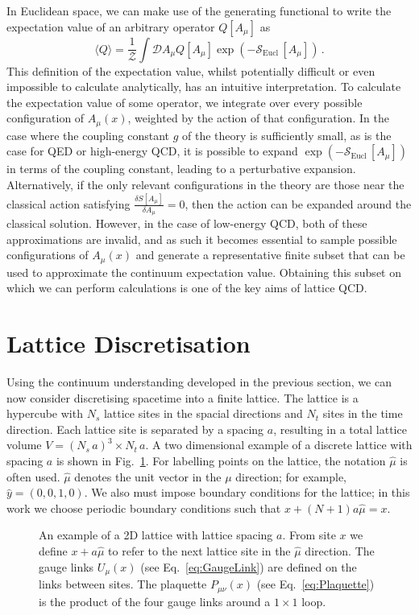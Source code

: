 In Euclidean space, we can make use of the generating functional to write the expectation value of an arbitrary operator $Q[A_\mu]$ as~\cite{Luscher:1984xn}
%
\begin{equation}
\langle Q \rangle = \frac{1}{\mathcal{Z}}\int \mathcal{D} A_\mu Q[A_\mu] \exp\left(-\mathcal{S}_{\text{Eucl}}\,[A_\mu]\right)\, .
\end{equation}
%
This definition of the expectation value, whilst potentially difficult or even impossible to calculate analytically, has an intuitive interpretation. To calculate the expectation value of some operator, we integrate over every possible configuration of $A_\mu(x)$, weighted by the action of that configuration. In the case where the coupling constant $g$ of the theory is sufficiently small, as is the case for QED or high-energy QCD, it is possible to expand $\exp\left(-\mathcal{S}_{\text{Eucl}}\,[A_\mu]\right)$ in terms of the coupling constant, leading to a perturbative expansion. Alternatively, if the only relevant configurations in the theory are those near the classical action satisfying $\frac{\delta S[A_\mu]}{\delta A_\mu}=0$, then the action can be expanded around the classical solution. However, in the case of low-energy QCD, both of these approximations are invalid, and as such it becomes essential to sample possible configurations of $A_\mu(x)$ and generate a representative finite subset that can be used to approximate the continuum expectation value. Obtaining this subset on which we can perform calculations is one of the key aims of lattice QCD.

\section{Lattice Discretisation}\label{sec:LatticeDiscretisation}
Using the continuum understanding developed in the previous section, we can now consider discretising spacetime into a finite lattice. The lattice is a hypercube with $N_s$ lattice sites in the spacial directions and $N_t$ sites in the time direction. Each lattice site is separated by a spacing $a$, resulting in a total lattice volume $V=(N_s\,a)^3\times N_t\,a$. A two dimensional example of a discrete lattice with spacing $a$ is shown in Fig.~\ref{fig:LatticeExample}. For labelling points on the lattice, the notation $\hat{\mu}$ is often used. $\hat{\mu}$ denotes the unit vector in the $\mu$ direction; for example, $\hat{y} = (0,0,1,0)$. We also must impose boundary conditions for the lattice; in this work we choose periodic boundary conditions such that $x+(N+1)a\hat{\mu}=x$.\\
%
\begin{figure}[ht]
\centering

\caption[An example of a 2D lattice with lattice spacing $a$.]{\label{fig:LatticeExample} An example of a 2D lattice with lattice spacing $a$. From site $x$ we define $x+a\hat{\mu}$ to refer to the next lattice site in the $\hat{\mu}$ direction. The gauge links $U_\mu(x)$ (see Eq.~\ref{eq:GaugeLink}) are defined on the links between sites. The plaquette $P_{\mu\nu}(x)$ (see Eq.~\ref{eq:Plaquette}) is the product of the four gauge links around a $1\times 1$ loop.}
\end{figure}
%


